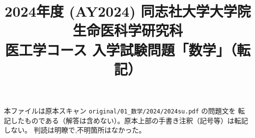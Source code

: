 \documentclass[11pt,a4paper]{article}
\title{2024年度 (AY2024) 同志社大学大学院 生命医科学研究科\\
医工学コース 入学試験問題「数学」（転記）}
\author{}
\date{}
\begin{document}
\maketitle
\vspace{-3em}

\begin{rem}
本ファイルは原本スキャン \texttt{original/01\_数学/2024/2024su.pdf} の問題文を
転記したものである（解答は含めない）。原本上部の手書き注釈（記号等）は転記しない。
判読は明瞭で,不明箇所はなかった。
\end{rem}

\bigskip

\bigskip

\bigskip

\bigskip

\end{document}

